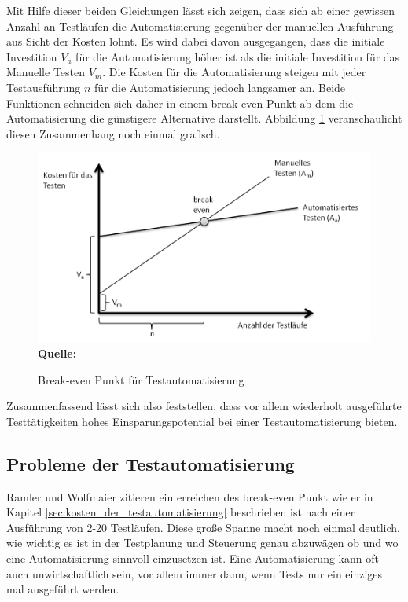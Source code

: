 Mit Hilfe dieser beiden Gleichungen lässt sich zeigen, dass sich ab einer gewissen Anzahl an Testläufen die Automatisierung gegenüber der manuellen Ausführung aus Sicht der Kosten lohnt.
Es wird dabei davon ausgegangen, dass die initiale Investition \(V_a\) für die Automatisierung höher ist als die initiale Investition für das Manuelle Testen \(V_m\).
Die Kosten für die Automatisierung steigen mit jeder Testausführung \(n\) für die Automatisierung jedoch langsamer an. Beide Funktionen schneiden sich daher in einem break-even Punkt ab dem die Automatisierung die günstigere Alternative darstellt.
Abbildung \ref{fig:breakEven} veranschaulicht diesen Zusammenhang noch einmal grafisch.

\begin{figure}[htb]
  \centering  
  \includegraphics[scale=0.8]{img/breakeven.png}\\
  \footnotesize\sffamily\textbf{Quelle:} \cite{ramler_economic_2006}
  \caption{Break-even Punkt für Testautomatisierung}
  \label{fig:breakEven}
\end{figure}

Zusammenfassend lässt sich also feststellen, dass vor allem wiederholt ausgeführte Testtätigkeiten hohes Einsparungspotential bei einer Testautomatisierung bieten.


\subsection{Probleme der Testautomatisierung}
\label{sec:probleme_der_testautomatisierung}
Ramler und Wolfmaier \cite{ramler_economic_2006} zitieren ein erreichen des break-even Punkt wie er in Kapitel \ref{sec:kosten_der_testautomatisierung} beschrieben ist nach einer Ausführung von 2-20 Testläufen. Diese große Spanne macht noch einmal deutlich, wie wichtig es ist in der Testplanung und Steuerung genau abzuwägen ob und wo eine Automatisierung sinnvoll einzusetzen ist. Eine Automatisierung kann oft auch unwirtschaftlich sein, vor allem immer dann, wenn Tests nur ein einziges mal ausgeführt werden. 


